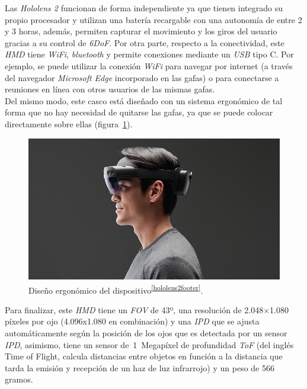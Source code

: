 Las \textit{Hololens 2} funcionan de forma independiente ya que tienen integrado su propio procesador y utilizan una batería recargable con una autonomía de entre 2 y 3 horas, además, permiten capturar el movimiento y los giros del usuario gracias a su control de \textit{6DoF}. Por otra parte, respecto a la conectividad, este \textit{HMD} tiene \textit{WiFi}, \textit{bluetooth} y permite conexiones mediante un \textit{USB} tipo C. Por ejemplo, se puede utilizar la conexión \textit{WiFi} para navegar por internet (a través del navegador \textit{Microsoft Edge} incorporado en las gafas) o para conectarse a reuniones en línea con otros usuarios de las mismas gafas.\\

Del mismo modo, este casco  está diseñado con un sistema ergonómico de tal forma que no hay necesidad de quitarse las gafas, ya que se puede colocar directamente sobre ellas (figura~\ref{fig:hololensErgonomicas}).\\


\begin{figure}[H]
    \centering
    \includegraphics[scale=0.35]{Images/Estado del arte/hololens2_1.jpeg}
     \caption{Diseño ergonómico del dispositivo\textsuperscript{\ref{hololens2footer}}.
  }
  \label{fig:hololensErgonomicas}
\end{figure}


Para finalizar, este \textit{HMD} tiene un \textit{FOV} de 43º, una resolución de 2.048×1.080 píxeles por ojo (4.096x1.080 en combinación) y una \textit{IPD} que se ajusta automáticamente según la posición de los ojos que es detectada por un sensor \textit{IPD}, asimismo, tiene un sensor de~1~Megapíxel de profundidad \textit{ToF} (del inglés Time of Flight, calcula distancias entre objetos en función a la distancia que tarda la emisión y recepción de un haz de luz infrarrojo) y un peso de 566 gramos.  




